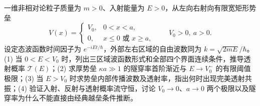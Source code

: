 一维非相对论粒子质量为 \(m>0\)、入射能量为 \(E>0\)，从左向右射向有限宽矩形势垒
\[
V(x)=\begin{cases}V_0,&0<x<a,\\0,&x\le0\text{ 或 }x\ge a,\end{cases}
\qquad V_0>0,\ a>0.
\]
设定态波函数时间因子为 \(e^{-iEt/\hbar}\)，外部左右区域的自由波数同为 \(k=\sqrt{2mE}/\hbar\)。
(1) 当 \(0<E<V_0\) 时，列出三区域波函数形式和全部四个界面连续条件，推导透射概率 \(\mathcal T(E)\)；(2) 求厚势垒 \(\kappa a\gg1\) 的隧穿率首阶渐近与 \(E\to V_0^-\) 的有限阈值极限；(3) 当 \(E>V_0\) 时求势垒内部传播波数及透射率，指出何时出现完美透射共振；(4) 验证入射、反射与透射概率流守恒，讨论 \(V_0\to0\)、\(a\to0\) 两个极限以及隧穿率为什么不能直接由经典越垒条件推断。
